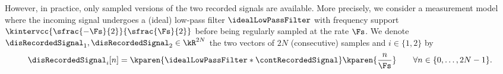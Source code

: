 However, in practice, only sampled versions of the two recorded signals are available.
More precisely, we consider a  measurement model where the incoming signal undergoes a (ideal) low-pass filter $\idealLowPassFilter$ with frequency support $\kintervcc{\sfrac{-\Fs}{2}}{\sfrac{\Fs}{2}}$ before being regularly sampled at the rate  $\Fs$.
We denote $\disRecordedSignal_1,\disRecordedSignal_2\in\kR^{2N}$ the two vectors of $2N$ (consecutive) samples and $i\in\{1, 2\}$ by
\begin{equation}
    \label{eq:measurement-process}
    \disRecordedSignal_i[n] =
    \kparen{\idealLowPassFilter \ast \contRecordedSignal}\kparen{\frac{n}{\Fs}}
    \qquad
    \forall n \in\{0, \dots, 2N-1\}
    .
\end{equation}






